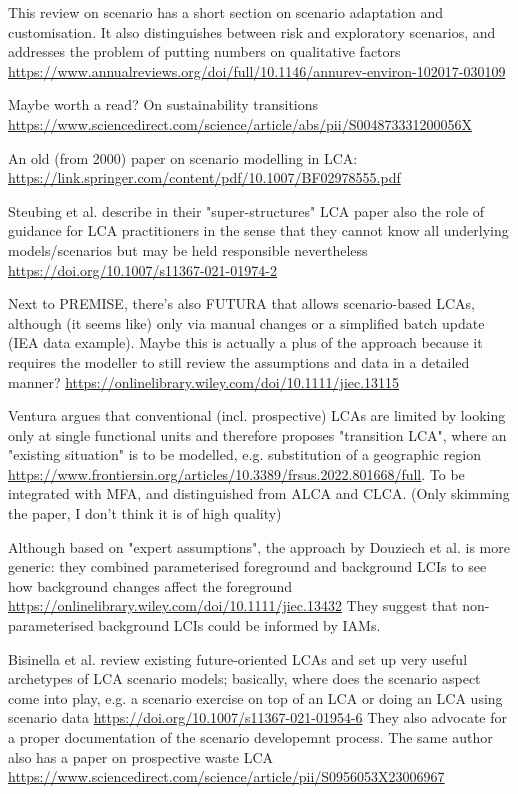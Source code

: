 \documentclass{article}
\begin{document}
This review on scenario has a short section on scenario adaptation and customisation. It also distinguishes between risk and exploratory scenarios, and addresses the problem of putting numbers on qualitative factors \url{https://www.annualreviews.org/doi/full/10.1146/annurev-environ-102017-030109}

Maybe worth a read? On sustainability transitions \url{https://www.sciencedirect.com/science/article/abs/pii/S004873331200056X}

An old (from 2000) paper on scenario modelling in LCA: \url{https://link.springer.com/content/pdf/10.1007/BF02978555.pdf}

Steubing et al. describe in their "super-structures" LCA paper also the role of guidance for LCA practitioners in the sense that they cannot know all underlying models/scenarios but may be held responsible nevertheless \url{https://doi.org/10.1007/s11367-021-01974-2}

Next to PREMISE, there's also FUTURA that allows scenario-based LCAs, although (it seems like) only via manual changes or a simplified batch update (IEA data example). Maybe this is actually a plus of the approach because it requires the modeller to still review the assumptions and data in a detailed manner? \url{https://onlinelibrary.wiley.com/doi/10.1111/jiec.13115}

Ventura argues that conventional (incl. prospective) LCAs are limited by looking only at single functional units and therefore proposes "transition LCA", where an "existing situation" is to be modelled, e.g. substitution of a geographic region  \url{https://www.frontiersin.org/articles/10.3389/frsus.2022.801668/full}. To be integrated with MFA, and distinguished from ALCA and CLCA. (Only skimming the paper, I don't think it is of high quality)

Although based on "expert assumptions", the approach by Douziech et al. is more generic: they combined parameterised foreground and background LCIs to see how background changes affect the foreground \url{https://onlinelibrary.wiley.com/doi/10.1111/jiec.13432} They suggest that non-parameterised background LCIs could be informed by IAMs.

Bisinella et al. review existing future-oriented LCAs and set up very useful archetypes of LCA scenario models; basically, where does the scenario aspect come into play, e.g. a scenario exercise on top of an LCA or doing an LCA using scenario data \url{https://doi.org/10.1007/s11367-021-01954-6} They also advocate for a proper documentation of the scenario developemnt process. The same author also has a paper on prospective waste LCA \url{https://www.sciencedirect.com/science/article/pii/S0956053X23006967}
\end{document}
